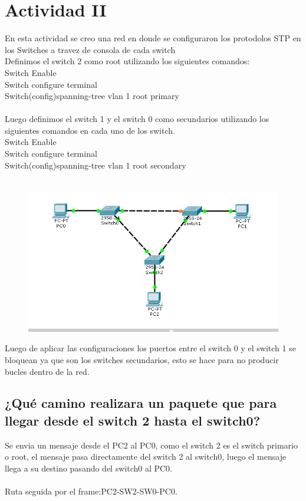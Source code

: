 \documentclass[spanish]{udpreport}
\begin{document}
\section{Actividad II}
En esta actividad se creo una red en donde se configuraron los protodolos STP en los Switches a travez de consola de cada switch\\
Definimos el switch 2 como root utilizando los siguientes comandos:\\
Switch Enable\\
Switch configure terminal\\
Switch(config)spanning-tree vlan 1 root primary\\\\

Luego definimos el switch 1 y el switch 0 como secundarios utilizando los siguientes comandos en cada uno de los switch.\\
Switch Enable\\
Switch configure terminal\\
Switch(config)spanning-tree vlan 1 root  secondary\\\\

\begin{figure}[H]
\begin{center}
\includegraphics[scale=0.7]{images/conSTP.PNG}
\end{center}
\end{figure}

Luego de aplicar las configuraciones los puertos entre el switch 0 y el switch 1 se bloquean ya que son los switches secundarios, esto se hace para no producir bucles dentro de la red.

\subsection{¿Qué camino realizara un paquete que para llegar desde el switch 2 hasta el switch0?}
Se envia un mensaje desde el PC2 al PC0, como el switch 2 es el switch primario o root, el mensaje pasa directamente del switch 2 al switch0, luego el mensaje llega a su destino pasando del switch0 al PC0.\\\\
Ruta seguida por el frame:PC2-SW2-SW0-PC0.
\end{document}
